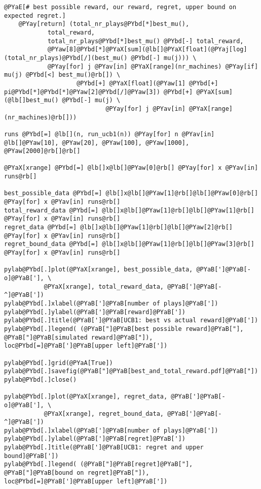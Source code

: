 \begin{Verbatim}[commandchars=@\[\]]
    @PYaE[# best possible reward, our reward, regret, upper bound on expected regret.]
    @PYay[return] (total_nr_plays@PYbd[*]best_mu(),
            total_reward,
            total_nr_plays@PYbd[*]best_mu() @PYbd[-] total_reward,
            @PYaw[8]@PYbd[*]@PYaX[sum](@lb[]@PYaX[float](@PYaj[log](total_nr_plays)@PYbd[/](best_mu() @PYbd[-] mu(j))) \
            @PYay[for] j @PYav[in] @PYaX[range](nr_machines) @PYay[if] mu(j) @PYbd[<] best_mu()@rb[]) \
                    @PYbd[+] @PYaX[float](@PYaw[1] @PYbd[+] pi@PYbd[*]@PYbd[*]@PYaw[2]@PYbd[/]@PYaw[3]) @PYbd[+] @PYaX[sum](@lb[]best_mu() @PYbd[-] mu(j) \
                            @PYay[for] j @PYav[in] @PYaX[range](nr_machines)@rb[]))

runs @PYbd[=] @lb[](n, run_ucb1(n)) @PYay[for] n @PYav[in] @lb[]@PYaw[10], @PYaw[20], @PYaw[100], @PYaw[1000], @PYaw[2000]@rb[]@rb[]

@PYaX[xrange] @PYbd[=] @lb[]x@lb[]@PYaw[0]@rb[] @PYay[for] x @PYav[in] runs@rb[]

best_possible_data @PYbd[=] @lb[]x@lb[]@PYaw[1]@rb[]@lb[]@PYaw[0]@rb[] @PYay[for] x @PYav[in] runs@rb[]
total_reward_data @PYbd[=] @lb[]x@lb[]@PYaw[1]@rb[]@lb[]@PYaw[1]@rb[] @PYay[for] x @PYav[in] runs@rb[]
regret_data @PYbd[=] @lb[]x@lb[]@PYaw[1]@rb[]@lb[]@PYaw[2]@rb[] @PYay[for] x @PYav[in] runs@rb[]
regret_bound_data @PYbd[=] @lb[]x@lb[]@PYaw[1]@rb[]@lb[]@PYaw[3]@rb[] @PYay[for] x @PYav[in] runs@rb[]

pylab@PYbd[.]plot(@PYaX[xrange], best_possible_data, @PYaB[']@PYaB[-o]@PYaB['], \
           @PYaX[xrange], total_reward_data, @PYaB[']@PYaB[-^]@PYaB['])
pylab@PYbd[.]xlabel(@PYaB[']@PYaB[number of plays]@PYaB['])
pylab@PYbd[.]ylabel(@PYaB[']@PYaB[reward]@PYaB['])
pylab@PYbd[.]title(@PYaB[']@PYaB[UCB1: best vs actual reward]@PYaB['])
pylab@PYbd[.]legend( (@PYaB["]@PYaB[best possible reward]@PYaB["], @PYaB["]@PYaB[simulated reward]@PYaB["]), loc@PYbd[=]@PYaB[']@PYaB[upper left]@PYaB['])

pylab@PYbd[.]grid(@PYaA[True])
pylab@PYbd[.]savefig(@PYaB["]@PYaB[best_and_total_reward.pdf]@PYaB["])
pylab@PYbd[.]close()

pylab@PYbd[.]plot(@PYaX[xrange], regret_data, @PYaB[']@PYaB[-o]@PYaB['], \
           @PYaX[xrange], regret_bound_data, @PYaB[']@PYaB[-^]@PYaB['])
pylab@PYbd[.]xlabel(@PYaB[']@PYaB[number of plays]@PYaB['])
pylab@PYbd[.]ylabel(@PYaB[']@PYaB[regret]@PYaB['])
pylab@PYbd[.]title(@PYaB[']@PYaB[UCB1: regret and upper bound]@PYaB['])
pylab@PYbd[.]legend( (@PYaB["]@PYaB[regret]@PYaB["], @PYaB["]@PYaB[bound on regret]@PYaB["]), loc@PYbd[=]@PYaB[']@PYaB[upper left]@PYaB['])


\end{Verbatim}
